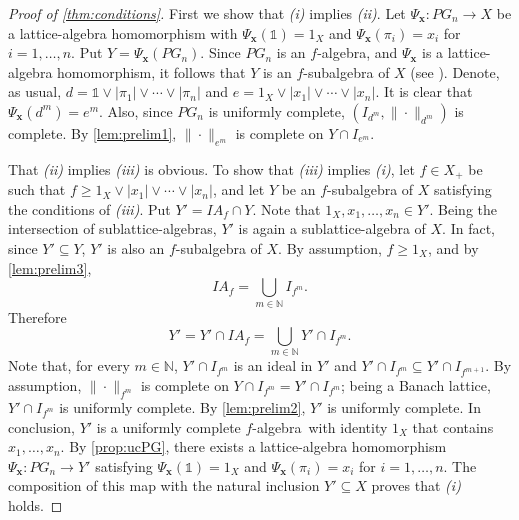 \documentclass{amsart}
\theoremstyle{plain}
\theoremstyle{definition}
\theoremstyle{remark}
\newcommand\N{\ensuremath{\mathbb{N}}}
\newcommand{\one}{\mathbb{1}}
\newcommand{\falg}{$f\!$-algebra}
\newcommand{\Psx}{\Psi_{\bm x}}
\begin{document}
\begin{proof}[Proof of \cref{thm:conditions}]
    First we show that \textit{(i)} implies \textit{(ii)}. Let
    $\Psx\colon PG_n\to X$ be a lattice-algebra homomorphism with
    $\Psx(\one)=1_X$ and $\Psx(\pi _i)=x_i$ for $i=1,\ldots ,n$. Put
    $Y=\Psx(PG_n)$. Since $PG_n$ is an \falg, and $\Psx$ is a
    lattice-algebra homomorphism, it follows that $Y$ is an
    $f\!$-subalgebra of $X$ (see \cite[Proposition
    3.2]{boulabiar2002}). Denote, as usual, $d=\one \vee |\pi
    _1|\vee \cdots \vee |\pi _n|$ and $e=1_X\vee |x_1|\vee \cdots \vee
    |x_n|$. It is clear that
    $\Psx(d^{m})=e^{m}$. Also, since $PG_n$ is uniformly complete,
    $(I_{d^{m}},\|{\cdot }\|_{d^{m}})$ is complete. By
    \cref{lem:prelim1}, $\|{\cdot }\|_{e^{m}}$ is complete on $Y\cap
    I_{e^{m}}$.

    That \textit{(ii)} implies \textit{(iii)} is obvious. To show that
    \textit{(iii)} implies \textit{(i)}, let $f \in X_+$ be such that
    $f\ge 1_X\vee |x_1|\vee \cdots \vee |x_n|$, and let $Y$ be
    an $f\!$-subalgebra of $X$ satisfying the conditions of
    \textit{(iii)}. Put $Y'=IA_f\cap Y$. Note that $1_X,x_1,\ldots
    ,x_n \in Y'$. Being the intersection of
    sublattice-algebras, $Y'$ is again a sublattice-algebra of $X$. In
    fact, since $Y'\subseteq Y$, $Y'$ is also an $f\!$-subalgebra of
    $X$. By assumption, $f\ge 1_X$, and by \cref{lem:prelim3},
    \[
    IA_f=\bigcup_{m \in \N} I_{f^{m}}.
    \]
    Therefore
    \[
    Y'=Y'\cap IA_f=\bigcup_{m \in \N} Y'\cap I_{f^{m}}.
    \]
    Note that, for every $m \in \N$, $Y'\cap I_{f^{m}}$ is an ideal in
    $Y'$ and $Y'\cap I_{f^{m}}\subseteq Y'\cap I_{f^{m+1}}$. By
    assumption, $\|{\cdot }\|_{f^{m}}$ is complete on $Y\cap
    I_{f^{m}}=Y'\cap I_{f^{m}}$; being a Banach
    lattice, $Y'\cap I_{f^{m}}$ is uniformly complete. By \cref{lem:prelim2}, $Y'$ is
    uniformly complete. In conclusion, $Y'$ is a uniformly complete
    \falg\ with identity $1_X$ that contains $x_1,\ldots ,x_n$. By
    \cref{prop:ucPG}, there exists a lattice-algebra homomorphism
    $\Psx\colon PG_n\to Y'$ satisfying $\Psx(\one)=1_X$ and $\Psx(\pi
    _i)=x_i$ for $i=1,\ldots ,n$. The composition of this map with the
    natural inclusion $Y'\subseteq X$ proves that \textit{(i)} holds.


\end{proof}
\end{document}
